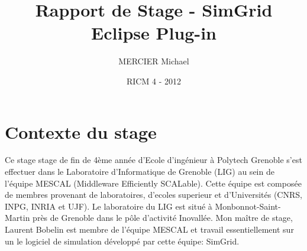 \documentclass{article}
\title{Rapport de Stage - SimGrid Eclipse Plug-in}
\author{MERCIER Michael}
\date{RICM 4 - 2012}
\makeatletter
\def\thetitle{\@title}
\def\theauthor{\@author}
\def\thedate{\@date}
\makeatother
\begin{document}
\begin{titlepage}
\centering

\vfill

{\Huge\bfseries \thetitle}

\vskip 1cm

{\Large \theauthor}

\vskip 0.5cm

\thedate

\vfill
\end{titlepage}


\tableofcontents

\newpage
\section{Contexte du stage}
	 Ce stage stage de fin de 4ème année d'Ecole d'ingénieur à Polytech Grenoble s'est effectuer dans le Laboratoire d'Informatique de Grenoble (LIG) au sein de l'équipe MESCAL (Middleware Efficiently SCALable). Cette équipe est composée de membres provenant de laboratoires, d'ecoles superieur et d'Universités (CNRS, INPG, INRIA et UJF). Le laboratoire du LIG est situé à Monbonnot-Saint-Martin près de Grenoble dans le pôle d'activité Inovallée.
	 Mon maître de stage, Laurent Bobelin est membre de l'équipe MESCAL et travail essentiellement sur un le logiciel de simulation développé par cette équipe: SimGrid.
\end{document}

